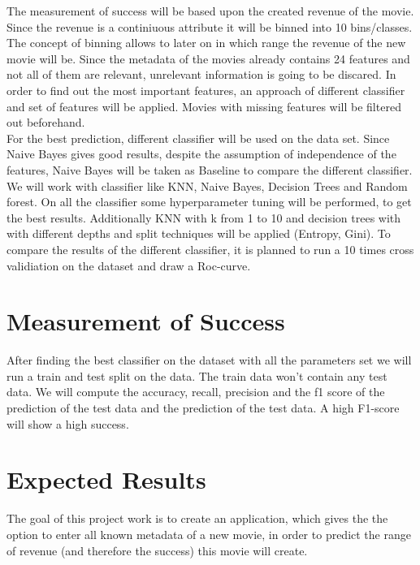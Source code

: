 The measurement of success will be based upon the created revenue of the movie. Since the revenue is a continiuous attribute it will be binned into 10 bins/classes. The concept of binning allows to later on in which range the revenue of the new movie will be.
Since the metadata of the movies already contains 24 features and not all of them are relevant, unrelevant information is going to be discared. In order to find out the most important features, an approach of different classifier and set of features will be applied. Movies with missing features will be filtered out beforehand. \\
For the best prediction, different classifier will be used on the data set. Since Naive Bayes gives good results, despite the assumption of independence of the features, Naive Bayes will be taken as Baseline to compare the different classifier. We will work with classifier like KNN, Naive Bayes, Decision Trees and Random forest. On all the classifier some hyperparameter tuning will be performed, to get the best results. Additionally KNN with k from 1 to 10 and decision trees with with different depths and split techniques will be applied (Entropy, Gini).
To compare the results of the different classifier, it is planned to run a 10 times cross validiation on the dataset and draw a Roc-curve.


\section{Measurement of Success}
After finding the best classifier on the dataset with all the parameters set we will run a train and test split on the data. The train data won't contain any test data. We will compute the accuracy, recall, precision and the f1 score of the prediction of the test data and the prediction of the test data. A high F1-score will show a high success.

\section{Expected Results}
The goal of this project work is to create an application, which gives the the option to enter all known metadata of a new movie, in order to predict the range of revenue (and therefore the success) this movie will create.





